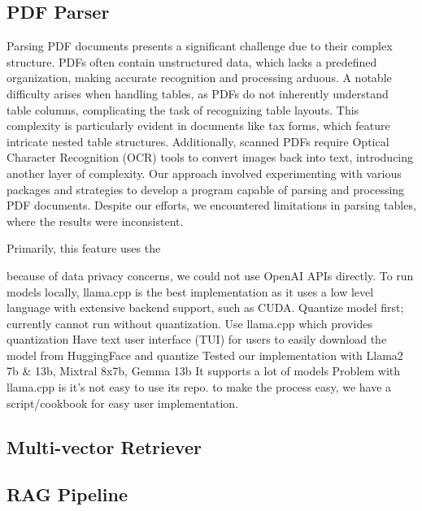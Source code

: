 \documentclass{scrartcl}
\begin{document}
\subsection {PDF Parser}
Parsing PDF documents presents a significant challenge due to their complex structure. PDFs often contain unstructured data, which lacks a predefined organization, making accurate recognition and processing arduous. A notable difficulty arises when handling tables, as PDFs do not inherently understand table columns, complicating the task of recognizing table layouts. This complexity is particularly evident in documents like tax forms, which feature intricate nested table structures. Additionally, scanned PDFs require Optical Character Recognition (OCR) tools to convert images back into text, introducing another layer of complexity.
Our approach involved experimenting with various packages and strategies to develop a program capable of parsing and processing PDF documents. Despite our efforts, we encountered limitations in parsing tables, where the results were inconsistent.

Primarily, this feature uses the


because of data privacy concerns, we could not use OpenAI APIs directly. To run models locally, llama.cpp is the best implementation as it uses a low level language with extensive backend support, such as CUDA.
Quantize model first; currently cannot run without quantization.
Use llama.cpp which provides quantization
Have text user interface (TUI) for users to easily download the model from HuggingFace and quantize
Tested our implementation with Llama2 7b & 13b, Mixtral 8x7b, Gemma 13b
It supports a lot of models
Problem with llama.cpp is it's not easy to use its repo. to make the process easy, we have a script/cookbook for easy user implementation.

\subsection{Multi-vector Retriever}

\subsection{RAG Pipeline}
\end{document}
